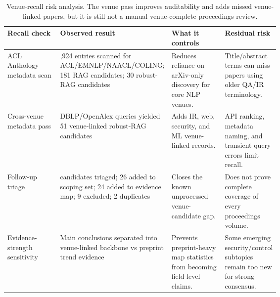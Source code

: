 \begin{table}[t]
\centering
\scriptsize
\renewcommand{\arraystretch}{0.9}
\begin{tabularx}{\linewidth}{>{\raggedright\arraybackslash}p{0.20\linewidth}>{\raggedright\arraybackslash}p{0.24\linewidth}>{\raggedright\arraybackslash}p{0.20\linewidth}X}
\toprule
\textbf{Recall check} & \textbf{Observed result} & \textbf{What it controls} & \textbf{Residual risk} \\
\midrule
ACL Anthology metadata scan & 12,924 entries scanned for ACL/EMNLP/NAACL/COLING; 181 RAG candidates; 30 robust-RAG candidates & Reduces reliance on arXiv-only discovery for core NLP venues. & Title/abstract terms can miss papers using older QA/IR terminology. \\
Cross-venue metadata pass & DBLP/OpenAlex queries yielded 51 venue-linked robust-RAG candidates & Adds IR, web, security, and ML venue-linked records. & API ranking, metadata naming, and transient query errors limit recall. \\
Follow-up triage & 51 candidates triaged; 26 added to scoping set; 24 added to evidence map; 9 excluded; 2 duplicates & Closes the known unprocessed venue-candidate gap. & Does not prove complete coverage of every proceedings volume. \\
Evidence-strength sensitivity & Main conclusions separated into venue-linked backbone vs preprint trend evidence & Prevents preprint-heavy map statistics from becoming field-level claims. & Some emerging security/control subtopics remain too new for strong consensus. \\
\bottomrule
\end{tabularx}
\caption{Venue-recall risk analysis. The venue pass improves auditability and adds missed venue-linked papers, but it is still not a manual venue-complete proceedings review.}
\label{tab:venue-recall-risk}
\end{table}

